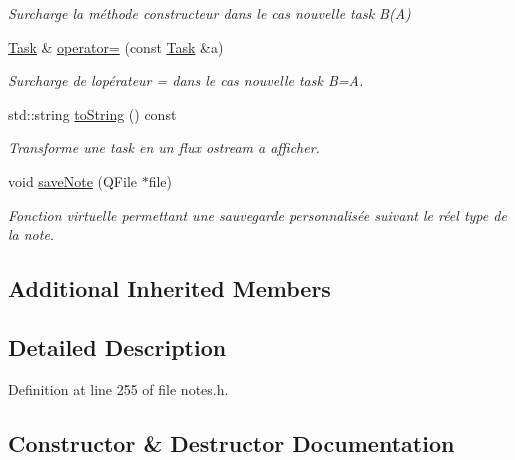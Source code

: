 \begin{DoxyCompactItemize}
\begin{DoxyCompactList}\small\item\em Surcharge la méthode constructeur dans le cas nouvelle task B(\+A) \end{DoxyCompactList}\item 
\hyperlink{class_task}{Task} \& \hyperlink{class_task_a2430b942d050bf32c771821daa31493f}{operator=} (const \hyperlink{class_task}{Task} \&a)
\begin{DoxyCompactList}\small\item\em Surcharge de l\textquotesingle{}opérateur = dans le cas nouvelle task B=A. \end{DoxyCompactList}\item 
std\+::string \hyperlink{class_task_a7fe5cb7b57a21693e7abfea2f9618563}{to\+String} () const
\begin{DoxyCompactList}\small\item\em Transforme une task en un flux ostream a afficher. \end{DoxyCompactList}\item 
void \hyperlink{class_task_a313eb342d047e8e5cab91bf51609a2f3}{save\+Note} (Q\+File $\ast$file)
\begin{DoxyCompactList}\small\item\em Fonction virtuelle permettant une sauvegarde personnalisée suivant le réel type de la note. \end{DoxyCompactList}\end{DoxyCompactItemize}
\subsection*{Additional Inherited Members}


\subsection{Detailed Description}


Definition at line 255 of file notes.\+h.



\subsection{Constructor \& Destructor Documentation}
\mbox{\label{class_task_a08a0f57803d8ef35f687f23f759e9f0c}} 
